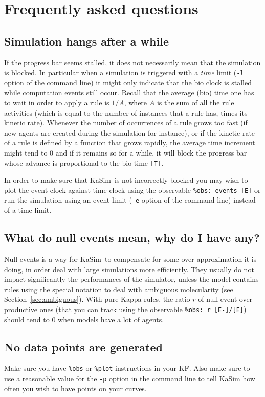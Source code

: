 \documentclass[11pt]{book}
\def\KaSim{\textsf{KaSim}}
\def\ttt#1{\texttt{#1}}
\begin{document}
\chapter{Frequently asked questions}
\section*{Simulation hangs after a while}
If the progress bar seems stalled, it does not necessarily mean that the simulation is blocked. In particular when a simulation is triggered with a \emph{time} limit (\ttt{-l} option of the command line) it might only indicate that the bio clock is stalled while computation events still occur. Recall that the average (bio) time one has to wait in order to apply a rule is $1/A$, where $A$ is the sum of all the rule activities (which is equal to the number of instances that a rule has, times its kinetic rate). Whenever the number of occurrences of a rule grows too fast (if new agents are created during the simulation for instance), or if the kinetic rate of a rule is defined by a function that grows rapidly, the average time increment might tend to 0 and if it remains so for a while, it will block the progress bar whose advance is proportional to the bio time \ttt{[T]}.

In order to make sure that \KaSim~is not incorrectly blocked you may wish to plot the event clock against time clock using the observable \ttt{\%obs: {\textquotesingle}events{\textquotesingle} [E]} or run the simulation using an event limit (\ttt{-e} option of the command line) instead of a time limit.

\section*{What do null events mean, why do I have any?}

Null events is a way for \KaSim~to compensate for some over approximation it is doing, in order deal with large simulations more efficiently. They usually do not impact significantly the performances of the simulator, unless the model contains rules using the special notation to deal with ambiguous molecularity (see Section~\ref{sec:ambiguous}). With pure Kappa rules, the ratio $r$ of null event over productive ones (that you can track using the observable \ttt{\%obs: {\textquotesingle}r{\textquotesingle}  [E-]/[E]}) should tend to 0 when models have a lot of agents.

\section*{No data points are generated}
Make sure you have \ttt{\%obs} or \ttt{\%plot} instructions in your KF. Also make sure to use a reasonable value for the \ttt{-p} option in the command line to tell KaSim how often you wish to have points on your curves.
\end{document}
